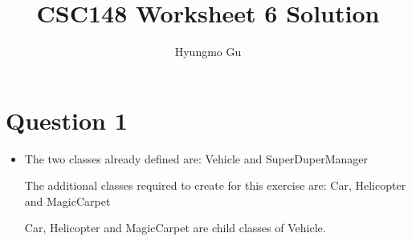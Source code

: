 \documentclass[12pt]{article}
\begin{document}
\title{CSC148 Worksheet 6 Solution}
\author{Hyungmo Gu}
\maketitle

\section*{Question 1}
\begin{itemize}
    \item

    The two classes already defined are: Vehicle and SuperDuperManager

    \bigskip

    The additional classes required to create for this exercise are: Car,
    Helicopter and MagicCarpet

    \bigskip

    Car, Helicopter and MagicCarpet are child classes of Vehicle.

\end{itemize}
\end{document}
